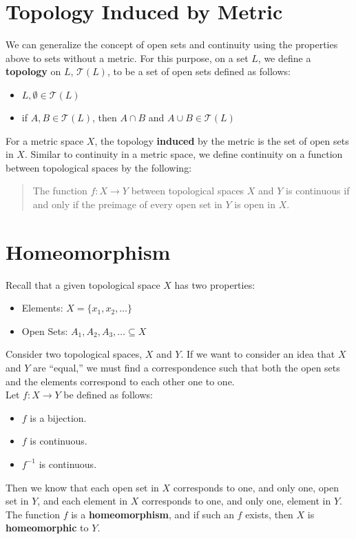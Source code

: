 \documentclass[12pt]{extarticle}
\begin{document}
  \section*{Topology Induced by Metric}%
  We can generalize the concept of open sets and continuity using the properties above to sets without a metric. For this purpose, on a set $L$, we define a \textbf{topology} on $L$, $ \mathcal{T}(L) $, to be a set of open sets defined as follows:
  \begin{itemize}
    \item $L, \emptyset \in \mathcal{T}(L)$
    \item if $A,B\in \mathcal{T}(L)$, then $A\cap B$ and $A\cup B\in \mathcal{T}(L)$
  \end{itemize}
  For a metric space $X$, the topology \textbf{induced} by the metric is the set of open sets in $X$. Similar to continuity in a metric space, we define continuity on a function between topological spaces by the following:
  \begin{quote}
    The function $f: X\rightarrow Y$ between topological spaces $X$ and $Y$ is continuous if and only if the preimage of every open set in $Y$ is open in $X$.
  \end{quote}
  \section*{Homeomorphism}%
  Recall that a given topological space $X$ has two properties:
  \begin{itemize}
    \item Elements: $X = \{x_1,x_2,\dots\}$
    \item Open Sets: $A_1,A_2,A_3,\dots \subseteq X$
  \end{itemize}
  Consider two topological spaces, $X$ and $Y$. If we want to consider an idea that $X$ and $Y$ are ``equal,'' we must find a correspondence such that both the open sets and the elements correspond to each other one to one.\\

  Let $f: X\rightarrow Y$ be defined as follows:
  \begin{itemize}
    \item $f$ is a bijection.
    \item $f$ is continuous.
    \item $f^{-1}$ is continuous.
  \end{itemize}
  Then we know that each open set in $X$ corresponds to one, and only one, open set in $Y$, and each element in $X$ corresponds to one, and only one, element in $Y$. The function $f$ is a \textbf{homeomorphism}, and if such an $f$ exists, then $X$ is \textbf{homeomorphic} to $Y$.
\end{document}
